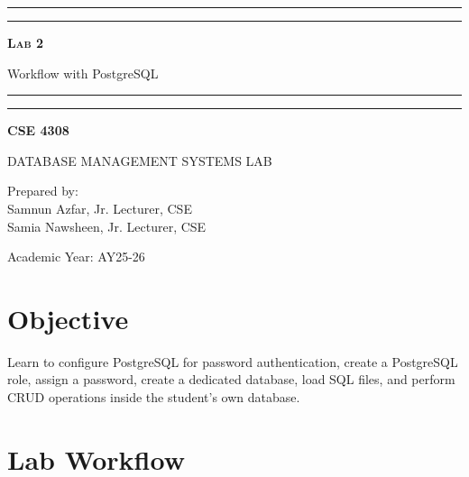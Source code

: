 \documentclass[12pt,a4paper]{article}
\begin{document}
\begin{titlepage}
    \centering
    \vspace*{2\baselineskip}

    \rule{14cm}{2pt}\vspace*{-0.8\baselineskip}\vspace*{1.5pt}
    \rule{14cm}{0.5pt}\vspace{2\baselineskip}

    {\Huge\bfseries\scshape Lab 2\par}
    \vspace{3mm}
    {\Large Workflow with PostgreSQL}

    \rule{14cm}{0.5pt}\vspace*{-0.7\baselineskip}\vspace{2.5pt}
    \rule{14cm}{2pt}

    \vspace{2\baselineskip}

    {\Large\bfseries CSE 4308\par}
    \vspace{1\baselineskip}
    {\large DATABASE MANAGEMENT SYSTEMS LAB}

    \vfill
    {\normalsize Prepared by:\\ Samnun Azfar, Jr. Lecturer, CSE\\ Samia Nawsheen, Jr. Lecturer, CSE\par}
    {\normalsize Academic Year: AY25-26\par}
\end{titlepage}

\newpage

\section*{Objective}
Learn to configure PostgreSQL for password authentication, create a PostgreSQL role, assign a password, create a dedicated database, load SQL files, and perform CRUD operations inside the student's own database.

\section*{Lab Workflow}
\end{document}
